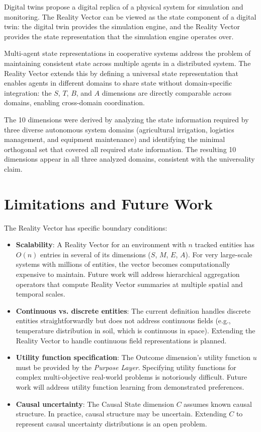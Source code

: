 \documentclass[12pt]{article}
\newcommand{\purpose}{\textit{Purpose Layer}}
\begin{document}
Digital twins \cite{grieves2019} propose a digital replica of a physical system for simulation and monitoring. The Reality Vector can be viewed as the state component of a digital twin: the digital twin provides the simulation engine, and the Reality Vector provides the state representation that the simulation engine operates over.

Multi-agent state representations in cooperative systems \cite{durfee1989} address the problem of maintaining consistent state across multiple agents in a distributed system. The Reality Vector extends this by defining a universal state representation that enables agents in different domains to share state without domain-specific integration: the $S$, $T$, $B$, and $A$ dimensions are directly comparable across domains, enabling cross-domain coordination.

The 10 dimensions were derived by analyzing the state information required by three diverse autonomous system domains (agricultural irrigation, logistics management, and equipment maintenance) and identifying the minimal orthogonal set that covered all required state information. The resulting 10 dimensions appear in all three analyzed domains, consistent with the universality claim.

\section{Limitations and Future Work}
\label{sec:limitations}

The Reality Vector has specific boundary conditions:

\begin{itemize}[noitemsep]
    \item \textbf{Scalability}: A Reality Vector for an environment with $n$ tracked entities has $O(n)$ entries in several of its dimensions ($S$, $M$, $E$, $A$). For very large-scale systems with millions of entities, the vector becomes computationally expensive to maintain. Future work will address hierarchical aggregation operators that compute Reality Vector summaries at multiple spatial and temporal scales.
    \item \textbf{Continuous vs. discrete entities}: The current definition handles discrete entities straightforwardly but does not address continuous fields (e.g., temperature distribution in soil, which is continuous in space). Extending the Reality Vector to handle continuous field representations is planned.
    \item \textbf{Utility function specification}: The Outcome dimension's utility function $u$ must be provided by the \purpose. Specifying utility functions for complex multi-objective real-world problems is notoriously difficult. Future work will address utility function learning from demonstrated preferences.
    \item \textbf{Causal uncertainty}: The Causal State dimension $C$ assumes known causal structure. In practice, causal structure may be uncertain. Extending $C$ to represent causal uncertainty distributions is an open problem.
\end{itemize}
\end{document}
